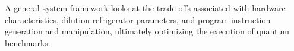 A general system framework looks at the trade offs associated with hardware characteristics, dilution refrigerator parameters, and program instruction generation and manipulation, ultimately optimizing the execution of quantum benchmarks.